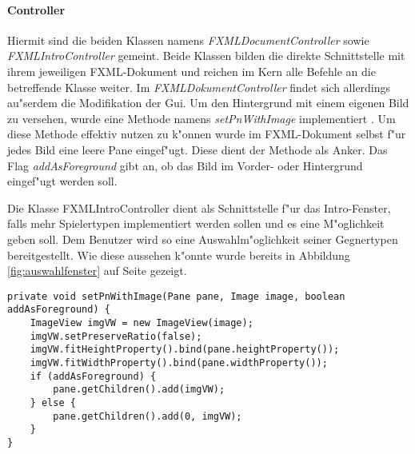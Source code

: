 \paragraph{Controller}
\label{par:controller}
Hiermit sind die beiden Klassen namens \emph{FXMLDocumentController} sowie \emph{FXMLIntroController} gemeint. Beide Klassen bilden die direkte Schnittstelle mit ihrem jeweiligen FXML-Dokument und reichen im Kern alle Befehle an die betreffende Klasse weiter. Im \emph{FXMLDokumentController} findet sich allerdings au"serdem die Modifikation der Gui. Um den Hintergrund mit einem eigenen Bild zu versehen, wurde eine Methode namens \emph{setPnWithImage} implementiert . Um diese Methode effektiv nutzen zu k"onnen wurde im FXML-Dokument selbst f"ur jedes Bild eine leere Pane eingef"ugt. Diese dient der Methode als Anker. Das Flag \emph{addAsForeground} gibt an, ob das Bild im Vorder- oder Hintergrund eingef"ugt werden soll. 

Die Klasse FXMLIntroController dient als Schnittstelle f"ur das Intro-Fenster, falls mehr Spielertypen implementiert werden sollen und es eine M"oglichkeit geben soll. Dem Benutzer wird so eine Auswahlm"oglichkeit seiner Gegnertypen bereitgestellt. Wie diese aussehen k"onnte wurde bereits in Abbildung \ref{fig:auswahlfenster} auf Seite \pageref{fig:auswahlfenster} gezeigt. 

\begin{lstlisting}[float,style=CodeHighlighting,caption=FXMLDocumentController - setPnWithImage,label=lst:fxmlDocumentController_setPnWithImage]
private void setPnWithImage(Pane pane, Image image, boolean addAsForeground) {
    ImageView imgVW = new ImageView(image);
    imgVW.setPreserveRatio(false);
    imgVW.fitHeightProperty().bind(pane.heightProperty());
    imgVW.fitWidthProperty().bind(pane.widthProperty());
    if (addAsForeground) {
        pane.getChildren().add(imgVW);
    } else {
        pane.getChildren().add(0, imgVW);
    }
}
\end{lstlisting}